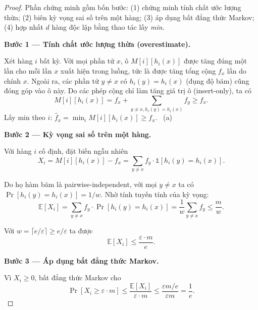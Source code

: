 \begin{proof}
Phần chứng minh gồm bốn bước: (1) chứng minh tính chất ước lượng thừa; (2) biên kỳ vọng sai số trên một hàng; (3) áp dụng bất đẳng thức Markov; (4) hợp nhất $d$ hàng độc lập bằng thao tác lấy \textit{min}.

\medskip\noindent\textbf{Bước 1 --- Tính chất ước lượng thừa (overestimate).}

Xét hàng $i$ bất kỳ. Với mọi phần tử $x$, ô $M[i][h_i(x)]$ được tăng đúng một lần cho mỗi lần $x$ xuất hiện trong luồng, tức là được tăng tổng cộng $f_x$ lần do chính $x$. Ngoài ra, các phần tử $y \ne x$ có $h_i(y) = h_i(x)$ (đụng độ băm) cũng đóng góp vào ô này. Do các phép cộng chỉ làm tăng giá trị ô (insert-only), ta có
\begin{equation}
M[i][h_i(x)] = f_x + \sum_{y \ne x, h_i(y) = h_i(x)} f_y \ge f_x.
\label{eq:cms-overestimate-row}
\end{equation}
Lấy min theo $i$: $\hat{f}_x = \min_i M[i][h_i(x)] \ge f_x$. \quad\checkmark~(a)

\medskip\noindent\textbf{Bước 2 --- Kỳ vọng sai số trên một hàng.}

Với hàng $i$ cố định, đặt biến ngẫu nhiên
\begin{equation}
X_i = M[i][h_i(x)] - f_x = \sum_{y \ne x} f_y \cdot \mathbb{1}[h_i(y) = h_i(x)].
\label{eq:collision-noise-xi}
\end{equation}

Do họ hàm băm là pairwise-independent, với mọi $y \ne x$ ta có $\Pr[h_i(y) = h_i(x)] = 1/w$. Nhờ tính tuyến tính của kỳ vọng:
\begin{equation}
\mathbb{E}[X_i] = \sum_{y \ne x} f_y \cdot \Pr[h_i(y) = h_i(x)] = \frac{1}{w}\sum_{y \ne x} f_y \le \frac{m}{w}.
\label{eq:expected-noise}
\end{equation}

Với $w = \lceil e/\varepsilon \rceil \ge e/\varepsilon$ ta được
\begin{equation}
\mathbb{E}[X_i] \le \frac{\varepsilon \cdot m}{e}.
\label{eq:expected-noise-bound}
\end{equation}

\medskip\noindent\textbf{Bước 3 --- Áp dụng bất đẳng thức Markov.}

Vì $X_i \ge 0$, bất đẳng thức Markov cho
\begin{equation}
\Pr[X_i \ge \varepsilon \cdot m] \le \frac{\mathbb{E}[X_i]}{\varepsilon \cdot m} \le \frac{\varepsilon m / e}{\varepsilon m} = \frac{1}{e}.
\label{eq:markov-row-failure}
\end{equation}


\end{proof}
